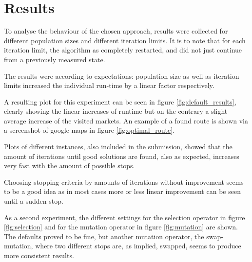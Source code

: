 \documentclass[10pt]{scrartcl}
\begin{document}
\section{Results}

To analyse the behaviour of the chosen approach, results were collected for different population sizes and different iteration limits. 
It is to note that for each iteration limit, the algorithm as completely restarted, and did not just continue from a previously measured state.

The results were according to expectations: population size as well as iteration limits increased the individual run-time by a linear factor respectively.

A resulting plot for this experiment can be seen in figure \ref{fig:default_results}, clearly showing the linear increases of runtime but on the contrary a slight average increase of the visited markets.
An example of a found route is shown via a screenshot of google maps in figure \ref{fig:optimal_route}.

Plots of different instances, also included in the submission, showed that the amount of iterations until good solutions are found, also as expected, increases very fast with the amount of possible stops.

Choosing stopping criteria by amounts of iterations without improvement seems to be a good idea as in most cases more or less linear improvement can be seen until a sudden stop.


As a second experiment, the different settings for the selection operator in figure \ref{fig:selection} and for the mutation operator in figure \ref{fig:mutation} are shown.
The defaults proved to be fine, but another mutation operator, the swap-mutation, where two different stops are, as implied, swapped, seems to produce more consistent results.



\end{document}
